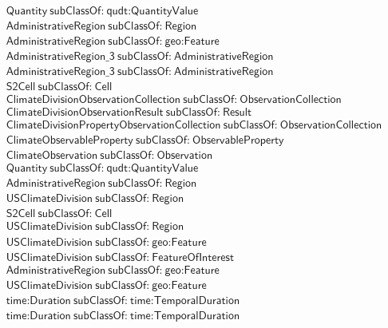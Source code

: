 \begin{align}
  \textsf{Quantity}~\textsf{subClassOf:}~\textsf{qudt:QuantityValue}\\
  \textsf{AdministrativeRegion}~\textsf{subClassOf:}~\textsf{Region}\\
  \textsf{AdministrativeRegion}~\textsf{subClassOf:}~\textsf{geo:Feature}\\
  \textsf{AdministrativeRegion\_3}~\textsf{subClassOf:}~\textsf{AdministrativeRegion}\\
  \textsf{AdministrativeRegion\_3}~\textsf{subClassOf:}~\textsf{AdministrativeRegion}\\
  \textsf{S2Cell}~\textsf{subClassOf:}~\textsf{Cell}\\
  \textsf{ClimateDivisionObservationCollection}~\textsf{subClassOf:}~\textsf{ObservationCollection}\\
  \textsf{ClimateDivisionObservationResult}~\textsf{subClassOf:}~\textsf{Result}\\
  \textsf{ClimateDivisionPropertyObservationCollection}~\textsf{subClassOf:}~\textsf{ObservationCollection}\\
  \textsf{ClimateObservableProperty}~\textsf{subClassOf:}~\textsf{ObservableProperty}\\
  \textsf{ClimateObservation}~\textsf{subClassOf:}~\textsf{Observation}\\
  \textsf{Quantity}~\textsf{subClassOf:}~\textsf{qudt:QuantityValue}\\
  \textsf{AdministrativeRegion}~\textsf{subClassOf:}~\textsf{Region}\\
  \textsf{USClimateDivision}~\textsf{subClassOf:}~\textsf{Region}\\
  \textsf{S2Cell}~\textsf{subClassOf:}~\textsf{Cell}\\
  \textsf{USClimateDivision}~\textsf{subClassOf:}~\textsf{Region}\\
  \textsf{USClimateDivision}~\textsf{subClassOf:}~\textsf{geo:Feature}\\
  \textsf{USClimateDivision}~\textsf{subClassOf:}~\textsf{FeatureOfInterest}\\
  \textsf{AdministrativeRegion}~\textsf{subClassOf:}~\textsf{geo:Feature}\\
  \textsf{USClimateDivision}~\textsf{subClassOf:}~\textsf{geo:Feature}\\
  \textsf{time:Duration}~\textsf{subClassOf:}~\textsf{time:TemporalDuration}\\
  \textsf{time:Duration}~\textsf{subClassOf:}~\textsf{time:TemporalDuration}\\

\end{align}
